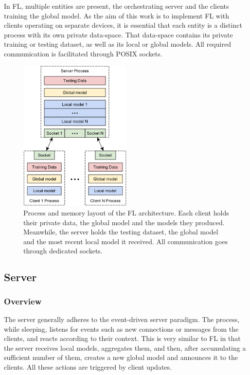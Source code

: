 In FL, multiple entities are present, the orchestrating server and the clients training the global model. As the aim of this work is to implement FL with clients operating on separate devices, it is essential that each entity is a distinct process with its own private data-space. That data-space contains its private training or testing dataset, as well as its local or global models. All required communication is facilitated through POSIX sockets.

\begin{figure}[H]
    \centering
        \includegraphics[width=0.5\textwidth]{Images/block_diagrams/memory_layout.png}
        \decoRule
        \caption[Process \& Memory layout]{Process and memory layout of the FL architecture. Each client holds their private data, the global model and the models they produced. Meanwhile, the server holds the testing dataset, the global model and the most recent local model it received. All communication goes through dedicated sockets.}
        \label{fig:process_mem_layout}
\end{figure}

\subsection{Server}
\subsubsection{Overview}
The server generally adheres to the event-driven server paradigm. The process, while sleeping, listens for events such as new connections or messages from the clients, and reacts according to their context. This is very similar to FL in that the server receives local models, aggregates them, and then, after accumulating a sufficient number of them, creates a new global model and announces it to the clients. All these actions are triggered by client updates.

